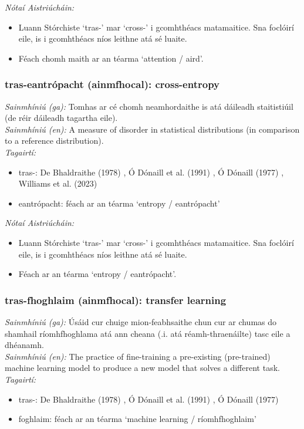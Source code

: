  \noindent \textit{Nótaí Aistriúcháin:}
\begin{itemize}
	\item Luann Stórchiste `tras-' mar `cross-' i gcomhthéacs matamaitice. Sna foclóirí eile, is i gcomhthéacs níos leithne atá sé luaite.
	\item Féach chomh maith ar an téarma `attention / aird'.
\end{itemize}


\subsubsection*{tras-eantrópacht (ainmfhocal): cross-entropy}
 \noindent \textit{Sainmhíniú (ga):} Tomhas ar cé chomh neamhordaithe is atá dáileadh staitistiúil (de réir dáileadh tagartha eile).
\\
 \noindent \textit{Sainmhíniú (en):} A measure of disorder in statistical distributions (in comparison to a reference distribution).
\\
 \noindent \textit{Tagairtí:}
\begin{itemize}
	\item tras-: De Bhaldraithe (1978) \cite{de-bhaldraithe}, Ó Dónaill et al. (1991) \cite{focloir-beag}, Ó Dónaill (1977) \cite{odonaill}, Williams et al. (2023) \cite{storchiste}
	\item eantrópacht: féach ar an téarma `entropy / eantrópacht'
\end{itemize}

 \noindent \textit{Nótaí Aistriúcháin:}
\begin{itemize}
	\item Luann Stórchiste `tras-' mar `cross-' i gcomhthéacs matamaitice. Sna foclóirí eile, is i gcomhthéacs níos leithne atá sé luaite.
	\item Féach ar an téarma `entropy / eantrópacht'.
\end{itemize}


\subsubsection*{tras-fhoghlaim (ainmfhocal): transfer learning}
 \noindent \textit{Sainmhíniú (ga):} Úsáid cur chuige mion-feabhsaithe chun cur ar chumas do shamhail ríomhfhoghlama atá ann cheana (.i. atá réamh-thraenáilte) tasc eile a dhéanamh.
\\
 \noindent \textit{Sainmhíniú (en):} The practice of fine-training a pre-existing (pre-trained) machine learning model to produce a new model that solves a different task.
\\
 \noindent \textit{Tagairtí:}
\begin{itemize}
	\item tras-: De Bhaldraithe (1978) \cite{de-bhaldraithe}, Ó Dónaill et al. (1991) \cite{focloir-beag}, Ó Dónaill (1977) \cite{odonaill}
	\item foghlaim: féach ar an téarma `machine learning / ríomhfhoghlaim'
\end{itemize}

